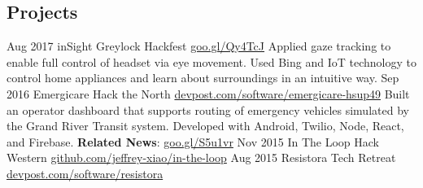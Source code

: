 \documentclass{resume}
\begin{document}
\begin{main}
    \section{Projects}
      \begin{entrylist}
        \rightentry%
          {Aug 2017}%
          {inSight}%
          {Greylock Hackfest}%
          {\href{https://goo.gl/Qy4TcJ}{goo.gl/Qy4TcJ}}%
          {%
          {%
            Applied gaze tracking to enable full control of headset via eye movement. %
          }%
          {%
            Used Bing and IoT technology to control home appliances and learn about surroundings %
            in an intuitive way. %
          }}
        \rightentry%
          {Sep 2016}%
          {Emergicare}%
          {Hack the North}%
          {\href{https://devpost.com/software/emergicare-hsup49}{devpost.com/software/emergicare-hsup49}}%
          {%
          {%
            Built an operator  dashboard that supports routing of emergency vehicles simulated by %
            the Grand River Transit system. %
          }%
          {%
            Developed with Android, Twilio, Node, React, and Firebase. %
          }%
          {%
            \textbf{Related News}: \color{lightred}\href{https://goo.gl/S5u1vr}{goo.gl/S5u1vr}%
          }}
        \rightentry%
          {Nov 2015}%
          {In The Loop}%
          {Hack Western}%
          {\href{https://github.com/jeffrey-xiao/in-the-loop}{github.com/jeffrey-xiao/in-the-loop}}%
          {}
        \rightentry%
          {Aug 2015}%
          {Resistora}%
          {Tech Retreat}%
          {\href{https://devpost.com/software/resistora}{devpost.com/software/resistora}}%
          {}
      \end{entrylist}
  \end{main}
\end{document}
